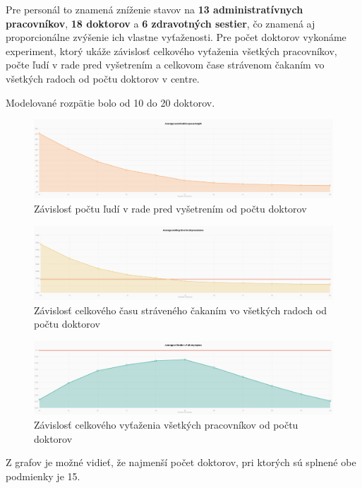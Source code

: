 \documentclass[letterpaper]{article}
\begin{document}
	Pre personál to znamená zníženie stavov na \textbf{13 administratívnych pracovníkov}, \textbf{18 doktorov} a \textbf{6 zdravotných sestier}, čo znamená aj proporcionálne zvýšenie ich vlastne vyťaženosti. Pre počet doktorov vykonáme experiment, ktorý ukáže závislosť celkového vyťaženia všetkých pracovníkov, počte ľudí v rade pred vyšetrením a celkovom čase strávenom čakaním vo všetkých radoch od počtu doktorov v centre.
	
	Modelované rozpätie bolo od 10 do 20 doktorov.
	
	\begin{figure}[hbt!]
		\centering
		\includegraphics[width=\textwidth]{src/QuExa}
		\caption{Závislosť počtu ľudí v rade pred vyšetrením od počtu doktorov}
	\end{figure}

	\begin{figure}[hbt!]
		\centering
		\includegraphics[width=\textwidth]{src/Time}
		\caption{Závislosť celkového času stráveného čakaním vo všetkých radoch od počtu doktorov}
	\end{figure}

	\begin{figure}[hbt!]
		\centering
		\includegraphics[width=\textwidth]{src/Util}
		\caption{Závislosť celkového vyťaženia všetkých pracovníkov od počtu doktorov}
	\end{figure}
	
	Z grafov je možné vidieť, že najmenší počet doktorov, pri ktorých sú splnené obe podmienky je 15.
	
\end{document}
